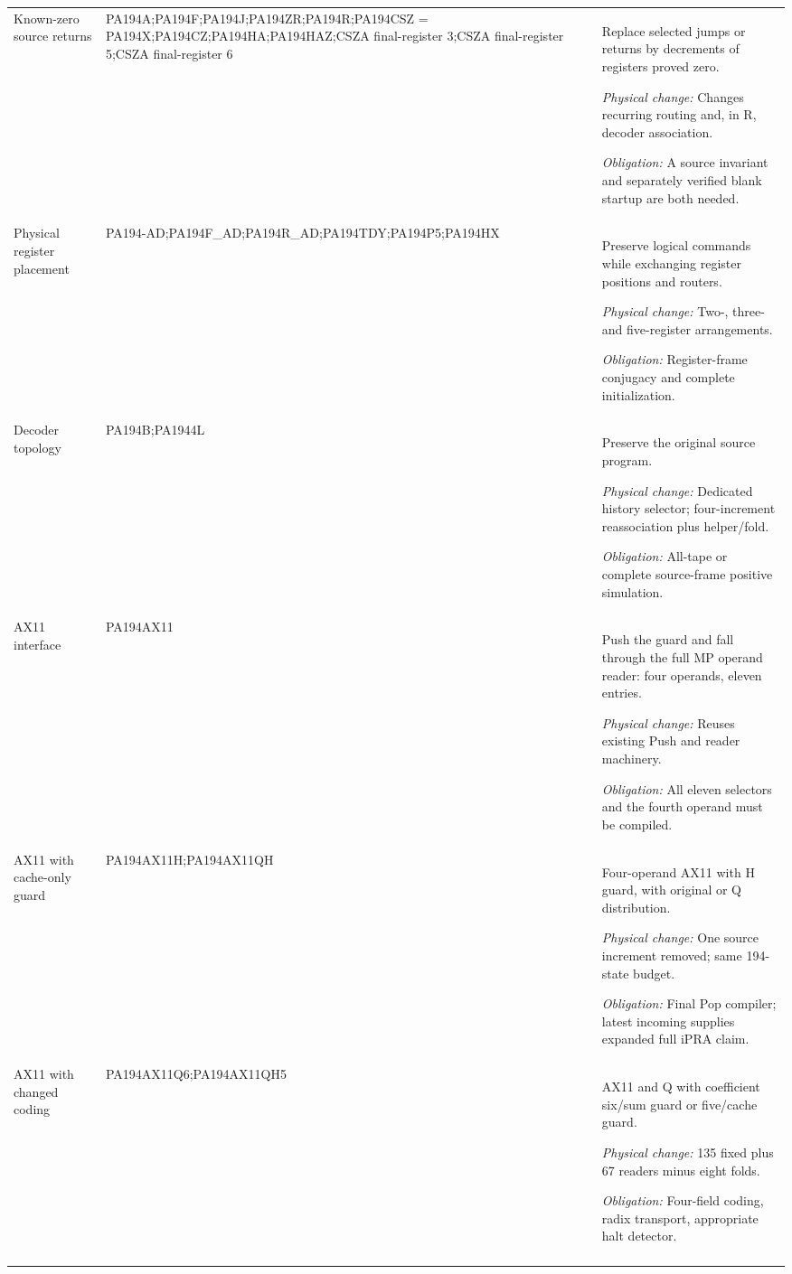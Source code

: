 {\begin{longtable}{@{}>{\raggedright\arraybackslash}p{}>{\raggedright\arraybackslash}p{}>{\raggedright\arraybackslash}p{}@{}}
Known-zero source returns & PA194A;\allowbreak PA194F;\allowbreak PA194J;\allowbreak PA194ZR;\allowbreak PA194R;\allowbreak PA194CSZ = PA194X;\allowbreak PA194CZ;\allowbreak PA194HA;\allowbreak PA194HAZ;\allowbreak CSZA final-register 3;\allowbreak CSZA final-register 5;\allowbreak CSZA final-register 6 & Replace selected jumps or returns by decrements of registers proved zero.\par\emph{Physical change:} Changes recurring routing and, in R, decoder association.\par\emph{Obligation:} A source invariant and separately verified blank startup are both needed.\\\addlinespace
Physical register placement & PA194-AD;\allowbreak PA194F\_AD;\allowbreak PA194R\_AD;\allowbreak PA194TDY;\allowbreak PA194P5;\allowbreak PA194HX & Preserve logical commands while exchanging register positions and routers.\par\emph{Physical change:} Two-, three- and five-register arrangements.\par\emph{Obligation:} Register-frame conjugacy and complete initialization.\\\addlinespace
Decoder topology & PA194B;\allowbreak PA1944L & Preserve the original source program.\par\emph{Physical change:} Dedicated history selector; four-increment reassociation plus helper/fold.\par\emph{Obligation:} All-tape or complete source-frame positive simulation.\\\addlinespace
AX11 interface & PA194AX11 & Push the guard and fall through the full MP operand reader: four operands, eleven entries.\par\emph{Physical change:} Reuses existing Push and reader machinery.\par\emph{Obligation:} All eleven selectors and the fourth operand must be compiled.\\\addlinespace
AX11 with cache-only guard & PA194AX11H;\allowbreak PA194AX11QH & Four-operand AX11 with H guard, with original or Q distribution.\par\emph{Physical change:} One source increment removed; same 194-state budget.\par\emph{Obligation:} Final Pop compiler; latest incoming supplies expanded full iPRA claim.\\\addlinespace
AX11 with changed coding & PA194AX11Q6;\allowbreak PA194AX11QH5 & AX11 and Q with coefficient six/sum guard or five/cache guard.\par\emph{Physical change:} 135 fixed plus 67 readers minus eight folds.\par\emph{Obligation:} Four-field coding, radix transport, appropriate halt detector.\\\addlinespace

\end{longtable}}
